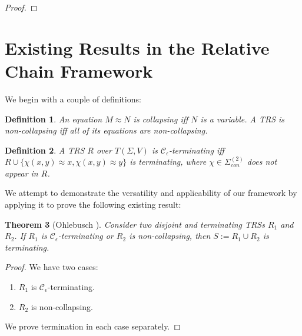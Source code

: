 \documentclass{article}
\newtheorem{theorem}{Theorem}[section]
\newtheorem{definition}[theorem]{Definition}
\renewcommand\em{\bfseries}
\begin{document}
\begin{proof}
    
\end{proof}



\section{Existing Results in the Relative Chain Framework}

We begin with a couple of definitions:
\begin{definition}
    An equation $M \approx N$ is \emph{collapsing} iff $N$ is a variable. A TRS is \emph{non-collapsing} iff all of its equations are non-collapsing. 
\end{definition}
\begin{definition}
    A TRS $R$ over $T(\Sigma, V)$ is \emph{$\mathcal{C}_\epsilon$-terminating} iff $R \cup \{\chi(x, y) \approx x, \chi (x, y)\approx y\}$ is terminating, where $\chi \in \Sigma^{(2)}_{con}$ does not appear in $R$.   
\end{definition}

We attempt to demonstrate the versatility and applicability of our framework by applying it to prove the following existing result:
\begin{theorem}[Ohlebusch \cite{ohlebusch1994modular}]
    Consider two disjoint and terminating TRSs $R_1$ and $R_2$. If $R_1$ is $\mathcal{C}_\epsilon$-terminating or $R_2$ is non-collapsing, then $S := R_1 \cup R_2$ is terminating.
\end{theorem}

\begin{proof}
    We have two cases: \begin{enumerate}
        \item $R_1$ is $\mathcal{C}_\epsilon$-terminating.
        \item $R_2$ is non-collapsing.
    \end{enumerate}
    We prove termination in each case separately.


\end{proof}


\renewcommand\em{\it}
\printbibliography[title={References}]
\end{document}
